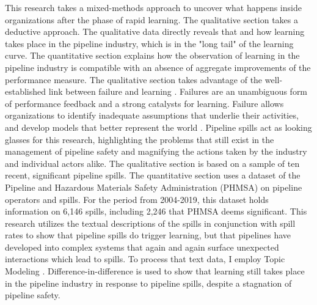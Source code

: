 This research takes a mixed-methods approach to uncover what happens inside organizations after the phase of rapid learning. The qualitative section takes a deductive approach. The qualitative data directly reveals that and how learning takes place in the pipeline industry, which is in the "long tail" of the learning curve. The quantitative section explains how the observation of learning in the pipeline industry is compatible with an absence of aggregate improvements of the performance measure. The qualitative section takes advantage of the well-established link between failure and learning \citep{Kim2007, Baum2007}. Failures are an unambiguous form of performance feedback and a strong catalysts for learning. Failure allows organizations to identify inadequate assumptions that underlie their activities, and develop models that better represent the world \citep{Madsen2010}. Pipeline spills act as looking glasses for this research, highlighting the problems that still exist in the management of pipeline safety and magnifying the actions taken by the industry and individual actors alike. The qualitative section is based on a sample of ten recent, significant pipeline spills. The quantitative section uses a dataset of the Pipeline and Hazardous Materials Safety Administration (PHMSA) on pipeline operators and spills. For the period from 2004-2019, this dataset holds information on 6,146 spills, including 2,246 that PHMSA deems significant. This research utilizes the textual descriptions of the spills in conjunction with spill rates to show that pipeline spills do trigger learning, but that pipelines have developed into complex systems that again and again surface unexpected interactions which lead to spills. To process that text data, I employ Topic Modeling \citep{Hannigan2019}. Difference-in-difference is used to show that learning still takes place in the pipeline industry in response to pipeline spills, despite a stagnation of pipeline safety.

